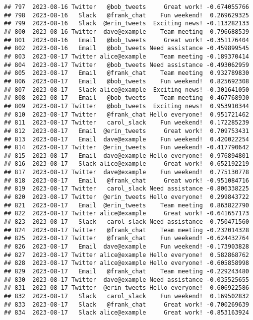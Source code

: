 \documentclass[
]{article}
\begin{document}
\begin{verbatim}
## 797  2023-08-16 Twitter   @bob_tweets     Great work! -0.674055766
## 798  2023-08-16   Slack   @frank_chat    Fun weekend!  0.269629325
## 799  2023-08-16   Slack  @erin_tweets  Exciting news! -0.113282133
## 800  2023-08-16 Twitter  dave@example    Team meeting  0.796688539
## 801  2023-08-16   Email   @bob_tweets     Great work! -0.351176404
## 802  2023-08-16   Email   @bob_tweets Need assistance -0.459899545
## 803  2023-08-17 Twitter alice@example    Team meeting -0.189370414
## 804  2023-08-17 Twitter   @bob_tweets Need assistance -0.493062959
## 805  2023-08-17   Email   @frank_chat    Team meeting  0.932789830
## 806  2023-08-17   Email   @bob_tweets    Fun weekend!  0.825692308
## 807  2023-08-17   Slack alice@example  Exciting news! -0.301641050
## 808  2023-08-17   Email   @bob_tweets    Team meeting -0.467768930
## 809  2023-08-17 Twitter   @bob_tweets  Exciting news!  0.953910344
## 810  2023-08-17 Twitter   @frank_chat Hello everyone!  0.951721462
## 811  2023-08-17 Twitter   carol_slack    Fun weekend!  0.172285239
## 812  2023-08-17   Email  @erin_tweets     Great work!  0.709753431
## 813  2023-08-17   Email  dave@example    Fun weekend!  0.420022254
## 814  2023-08-17 Twitter  @erin_tweets    Fun weekend! -0.417790642
## 815  2023-08-17   Email  dave@example Hello everyone!  0.976894801
## 816  2023-08-17   Slack alice@example     Great work!  0.652192219
## 817  2023-08-17 Twitter  dave@example    Fun weekend!  0.775130778
## 818  2023-08-17   Email   @frank_chat     Great work! -0.951084716
## 819  2023-08-17 Twitter   carol_slack Need assistance -0.806338225
## 820  2023-08-17 Twitter  @erin_tweets Hello everyone!  0.299843722
## 821  2023-08-17   Email  @erin_tweets    Team meeting  0.863822790
## 822  2023-08-17 Twitter alice@example     Great work! -0.641657173
## 823  2023-08-17   Slack   carol_slack Need assistance -0.750471560
## 824  2023-08-17 Twitter   @frank_chat    Team meeting -0.232014328
## 825  2023-08-17 Twitter   @frank_chat    Fun weekend! -0.624432764
## 826  2023-08-17   Email  dave@example    Fun weekend! -0.173903828
## 827  2023-08-17 Twitter alice@example Hello everyone!  0.582868762
## 828  2023-08-17 Twitter alice@example Hello everyone! -0.605858998
## 829  2023-08-17   Email   @frank_chat    Team meeting -0.229243480
## 830  2023-08-17 Twitter  dave@example Need assistance -0.035525655
## 831  2023-08-17 Twitter  @erin_tweets Hello everyone! -0.606922586
## 832  2023-08-17   Slack   carol_slack    Fun weekend!  0.169502832
## 833  2023-08-17   Slack   @frank_chat     Great work! -0.700269639
## 834  2023-08-17   Slack alice@example     Great work! -0.853163924

\end{verbatim}
\end{document}

